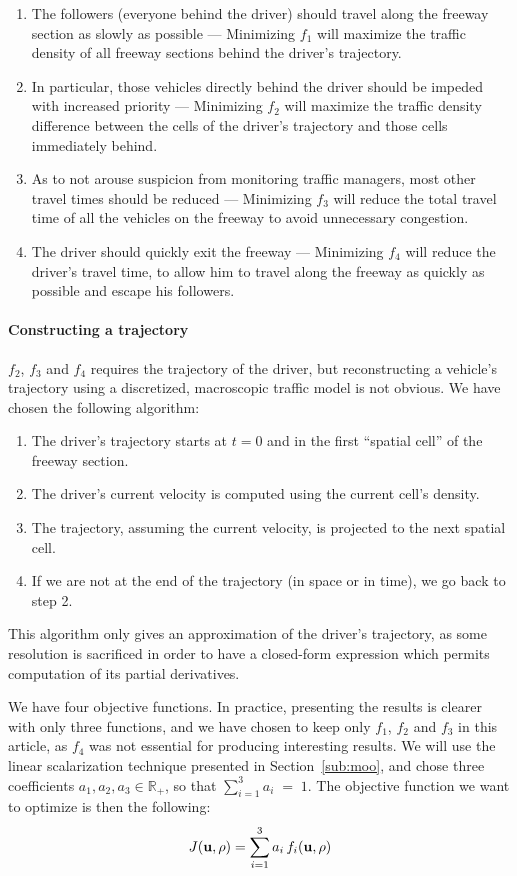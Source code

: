 \begin{enumerate}
\item The followers (everyone behind the driver) should travel along the freeway section as slowly as possible --- Minimizing $f_1$ will maximize the traffic density of all freeway sections behind the driver's trajectory.

\item In particular, those vehicles directly behind the driver should be impeded with increased priority --- Minimizing $f_2$ will maximize the traffic density difference between the cells of the driver's trajectory and those cells immediately behind.
\item As to not arouse suspicion from monitoring traffic managers, most other travel times should be reduced --- Minimizing $f_3$ will reduce the total travel time of all the vehicles on the freeway to avoid unnecessary congestion.
\item The driver should quickly exit the freeway --- Minimizing $f_4$ will reduce the driver's travel time, to allow him to travel along the freeway as quickly as possible and escape his followers.
\end{enumerate}


\paragraph{Constructing a trajectory}
$f_2$, $f_3$ and $f_4$ requires the trajectory of the driver, but reconstructing a vehicle's trajectory using a discretized, macroscopic traffic model is not obvious. We have chosen the following algorithm:
\begin{enumerate}
\item The driver's trajectory starts at $t = 0$ and in the first ``spatial cell'' of the freeway section.
\item The driver's current velocity is computed using the current cell's density.
\item The trajectory, assuming the current velocity, is projected to the next spatial cell.
\item If we are not at the end of the trajectory (in space or in time), we go back to step 2.
\end{enumerate}

This algorithm only gives an approximation of the driver's trajectory, as some resolution is sacrificed in order to have a closed-form expression which permits computation of its partial derivatives.


We have four objective functions. In practice, presenting the results is clearer with only three functions, and we have chosen to keep only $f_1$, $f_2$ and $f_3$ in this article, as $f_4$ was not essential for producing interesting results. We will use the linear scalarization technique presented in Section~\ref{sub:moo}, and chose three coefficients $a_1, a_2, a_3 \in \mathbb{R}_+$, so that $\sum_{i=1}^3 a_i \; = \; 1$. The objective function we want to optimize is then the following:
\begin{equation}
J \left( \vectorize{u}, \vectorize{\rho} \right) = \sum_{i=1}^3 a_i \, f_i \left( \vectorize{u}, \vectorize{\rho} \right)	
\end{equation}

